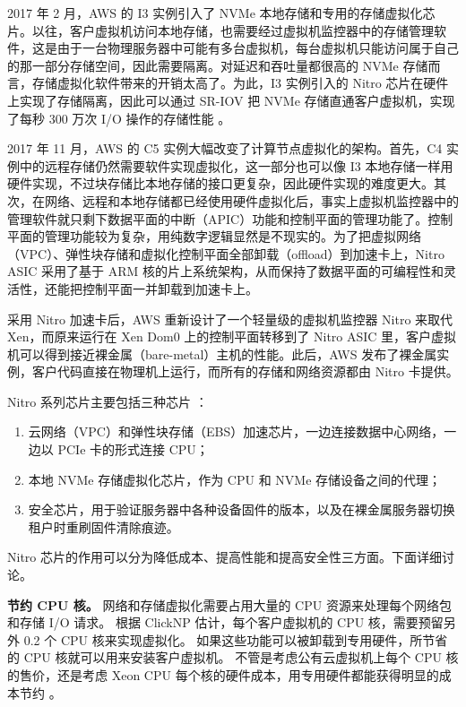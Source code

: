 2017 年 2 月，AWS 的 I3 实例引入了 NVMe 本地存储和专用的存储虚拟化芯片。以往，客户虚拟机访问本地存储，也需要经过虚拟机监控器中的存储管理软件，这是由于一台物理服务器中可能有多台虚拟机，每台虚拟机只能访问属于自己的那一部分存储空间，因此需要隔离。对延迟和吞吐量都很高的 NVMe 存储而言，存储虚拟化软件带来的开销太高了。为此，I3 实例引入的 Nitro 芯片在硬件上实现了存储隔离，因此可以通过 SR-IOV 把 NVMe 存储直通客户虚拟机，实现了每秒 300 万次 I/O 操作的存储性能 \cite{aws-local-storage}。

2017 年 11 月，AWS 的 C5 实例大幅改变了计算节点虚拟化的架构。首先，C4 实例中的远程存储仍然需要软件实现虚拟化，这一部分也可以像 I3 本地存储一样用硬件实现，不过块存储比本地存储的接口更复杂，因此硬件实现的难度更大。其次，在网络、远程和本地存储都已经使用硬件虚拟化后，事实上虚拟机监控器中的管理软件就只剩下数据平面的中断（APIC）功能和控制平面的管理功能了。控制平面的管理功能较为复杂，用纯数字逻辑显然是不现实的。为了把虚拟网络（VPC）、弹性块存储和虚拟化控制平面全部卸载（offload）到加速卡上，Nitro ASIC 采用了基于 ARM 核的片上系统架构，从而保持了数据平面的可编程性和灵活性，还能把控制平面一并卸载到加速卡上。

采用 Nitro 加速卡后，AWS 重新设计了一个轻量级的虚拟机监控器 Nitro 来取代 Xen，而原来运行在 Xen Dom0 上的控制平面转移到了 Nitro ASIC 里，客户虚拟机可以得到接近裸金属（bare-metal）主机的性能。此后，AWS 发布了裸金属实例，客户代码直接在物理机上运行，而所有的存储和网络资源都由 Nitro 卡提供。

Nitro 系列芯片主要包括三种芯片 \cite{nitro-blog,nitro-talk,nitro-web}：
\begin{enumerate}
	\item 云网络（VPC）和弹性块存储（EBS）加速芯片，一边连接数据中心网络，一边以 PCIe 卡的形式连接 CPU；
	\item 本地 NVMe 存储虚拟化芯片，作为 CPU 和 NVMe 存储设备之间的代理；
	\item 安全芯片，用于验证服务器中各种设备固件的版本，以及在裸金属服务器切换租户时重刷固件清除痕迹。
\end{enumerate}

Nitro 芯片的作用可以分为降低成本、提高性能和提高安全性三方面。下面详细讨论。

\textbf{节约 CPU 核。}
网络和存储虚拟化需要占用大量的 CPU 资源来处理每个网络包和存储 I/O 请求。
根据 ClickNP \cite{li2016clicknp} 估计，每个客户虚拟机的 CPU 核，需要预留另外 0.2 个 CPU 核来实现虚拟化。
如果这些功能可以被卸载到专用硬件，所节省的 CPU 核就可以用来安装客户虚拟机。
不管是考虑公有云虚拟机上每个 CPU 核的售价，还是考虑 Xeon CPU 每个核的硬件成本，用专用硬件都能获得明显的成本节约 \cite{smartnic}。

